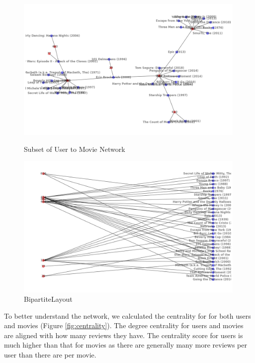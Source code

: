 \documentclass[12pt]{article}
\numberwithin{equation}{section}
\begin{document}
\begin{figure}[h!]
\centering
    \begin{minipage}[b]{0.49\linewidth}
         \centering
  	\includegraphics[width=0.99\textwidth]{sample_graph.png}
  	\caption{Subset of User to Movie Network}
  	\label{fig:count_ranking 2} 
    \end{minipage}
    \hspace{0.01cm}
    \begin{minipage}[b]{0.49\linewidth}
        \centering
  	\includegraphics[width=0.99\textwidth]{bipartite.png}
  	\caption{BipartiteLayout}
  	\label{fig:ranking_ts 2}
    \end{minipage}
\end{figure}


To better understand the network, we calculated the centrality for for both users and movies (Figure \ref{fig:centrality}).
The degree centrality for users and movies are aligned with how many reviews they have. The centrality score for users is much higher than that for movies as there are generally many more reviews per user than there are per movie. 
\end{document}
